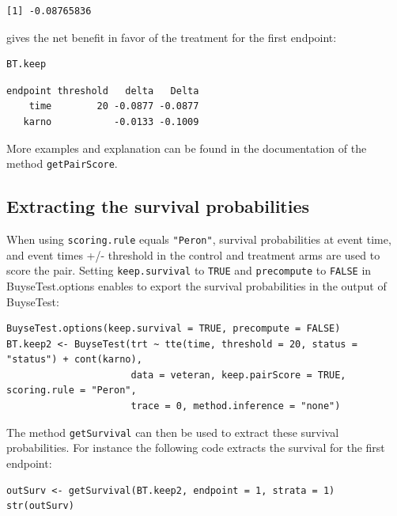 \documentclass[12pt]{article}
\begin{document}
\begin{verbatim}
[1] -0.08765836
\end{verbatim}


gives the net benefit in favor of the treatment for the first
endpoint:
\lstset{language=r,label= ,caption= ,captionpos=b,numbers=none}
\begin{lstlisting}
BT.keep
\end{lstlisting}

\begin{verbatim}
endpoint threshold   delta   Delta
    time        20 -0.0877 -0.0877
   karno           -0.0133 -0.1009
\end{verbatim}


More examples and explanation can be found in the documentation of
the method \texttt{getPairScore}.

\subsection{Extracting the survival probabilities}
\label{sec:org77f2bdc}
When using \texttt{scoring.rule} equals \texttt{"Peron"}, survival probabilities at
event time, and event times +/- threshold in the control and treatment
arms are used to score the pair. Setting \texttt{keep.survival} to \texttt{TRUE} and
\texttt{precompute} to \texttt{FALSE} in BuyseTest.options enables to export the
survival probabilities in the output of BuyseTest:
\lstset{language=r,label= ,caption= ,captionpos=b,numbers=none}
\begin{lstlisting}
BuyseTest.options(keep.survival = TRUE, precompute = FALSE)
BT.keep2 <- BuyseTest(trt ~ tte(time, threshold = 20, status = "status") + cont(karno),
                      data = veteran, keep.pairScore = TRUE, scoring.rule = "Peron",
                      trace = 0, method.inference = "none")
\end{lstlisting}

The method \texttt{getSurvival} can then be used to extract these survival
probabilities. For instance the following code extracts the survival
for the first endpoint:
\lstset{language=r,label= ,caption= ,captionpos=b,numbers=none}
\begin{lstlisting}
outSurv <- getSurvival(BT.keep2, endpoint = 1, strata = 1)
str(outSurv)
\end{lstlisting}
\end{document}
